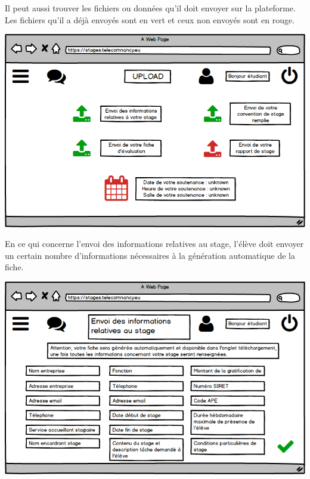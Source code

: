\documentclass{scrreprt}
\begin{document}
\vspace{7cm}
\begin{flushleft}
\hspace{1cm}Il peut aussi trouver les fichiers ou données qu'il doit envoyer sur la plateforme. Les fichiers qu'il a déjà envoyés sont en vert et ceux non envoyés sont en rouge.
\end{flushleft}
\begin{center}
\centerline{\includegraphics[scale=0.65]{image/uploadeleve.png}}
\end{center}
\begin{flushleft}
\vspace{7,5cm}
\hspace{1cm}En ce qui concerne l'envoi des informations relatives au stage, l'élève doit envoyer un certain nombre d'informations nécessaires à la génération automatique de la fiche.
\end{flushleft}
\begin{center}
\centerline{\includegraphics[scale=0.65]{image/inforelativesstages.png}}
\end{center}
\end{document}
